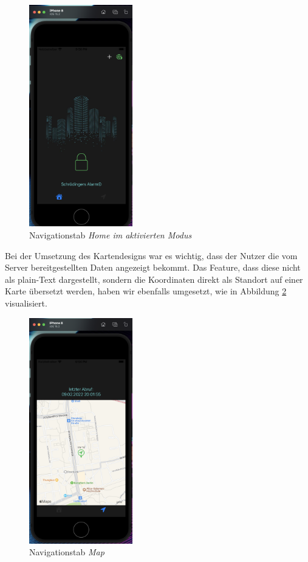 \begin{figure} [H]
	\begin{center}
		\includegraphics[width=0.4\textwidth]{Bilder/iOS_home.png}
		\caption{Navigationstab \textit{Home im aktivierten Modus}}
		\label{lock}
	\end{center}
\end{figure}
Bei der Umsetzung  des Kartendesigns war es wichtig, dass der Nutzer die vom Server bereitgestellten Daten angezeigt bekommt. Das  Feature, dass diese nicht als plain-Text dargestellt, sondern die Koordinaten direkt als Standort auf einer Karte übersetzt werden, haben wir ebenfalls umgesetzt, wie in Abbildung \ref{Map} visualisiert.
\begin{figure} [H]
	\begin{center}
		\includegraphics[width=0.4\textwidth]{Bilder/iOS_map.png}
		\caption{Navigationstab \textit{Map}}
		\label{Map}
	\end{center}
\end{figure}
